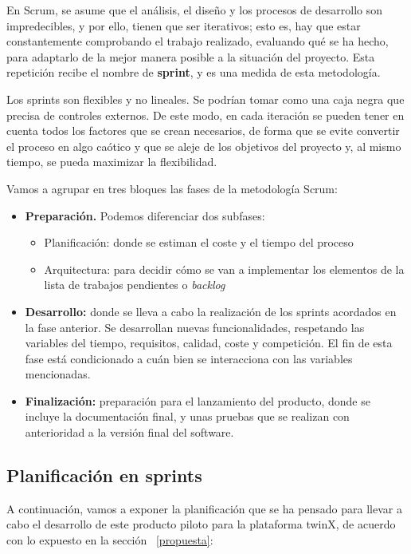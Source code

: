 En Scrum, se asume que el análisis, el diseño y los procesos de desarrollo son impredecibles, y por ello, tienen que ser iterativos; esto es, hay que estar constantemente comprobando el trabajo realizado, evaluando qué se ha hecho, para adaptarlo de la mejor manera posible a la situación del proyecto. Esta repetición recibe el nombre de \textbf{sprint}, y es una medida de esta metodología.

Los sprints son flexibles y no lineales. Se podrían tomar como una caja negra que precisa de controles externos. De este modo, en cada iteración se pueden tener en cuenta todos los factores que se crean necesarios, de forma que se evite convertir el proceso en algo caótico y que se aleje de los objetivos del proyecto y, al mismo tiempo, se pueda maximizar la flexibilidad. \cite{scrum}

Vamos a agrupar en tres bloques las fases de la metodología Scrum:
\begin{itemize}
	\item \textbf{Preparación.} Podemos diferenciar dos subfases:
	\begin{itemize}
		\item Planificación: donde se estiman el coste y el tiempo del proceso
		\item Arquitectura: para decidir cómo se van a implementar los elementos de la lista de trabajos pendientes o \textit{backlog}
	\end{itemize} 
	\item \textbf{Desarrollo:} donde se lleva a cabo la realización de los sprints acordados en la fase anterior. Se desarrollan nuevas funcionalidades, respetando las variables del tiempo, requisitos, calidad, coste y competición. El fin de esta fase está condicionado a cuán bien se interacciona con las variables mencionadas.
	\item \textbf{Finalización:} preparación para el lanzamiento del producto, donde se incluye la documentación final, y unas pruebas que se realizan con anterioridad a la versión final del software.
\end{itemize}

\subsection{Planificación en sprints}

A continuación, vamos a exponer la planificación que se ha pensado para llevar a cabo el desarrollo de este producto piloto para la plataforma twinX, de acuerdo con lo expuesto en la sección ~\ref{propuesta}:

